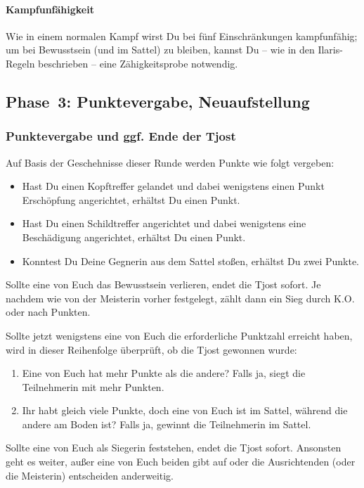 \documentclass[12pt,div=calc,a5paper,parskip=half]{scrartcl}
\begin{document}
\paragraph{Kampfunfähigkeit} Wie in einem normalen Kampf wirst Du bei fünf Einschränkungen kampfunfähig; um bei Bewusstsein (und im Sattel) zu bleiben, kannst Du -- wie in den Ilaris-Regeln beschrieben -- eine Zähigkeitsprobe notwendig. 

\subsection{Phase~3: Punktevergabe, Neuaufstellung}

\subsubsection{Punktevergabe und ggf. Ende der Tjost}
Auf Basis der Geschehnisse dieser Runde werden Punkte wie folgt vergeben:
\begin{itemize}
    \item Hast Du einen Kopftreffer gelandet und dabei wenigstens einen Punkt Erschöpfung angerichtet, erhältst Du einen Punkt. 
    \item Hast Du einen Schildtreffer angerichtet und dabei wenigstens eine Beschädigung angerichtet, erhältst Du einen Punkt.
    \item Konntest Du Deine Gegnerin aus dem Sattel stoßen, erhältst Du zwei Punkte.  
\end{itemize}
Sollte eine von Euch das Bewusstsein verlieren, endet die Tjost sofort. Je nachdem wie von der Meisterin vorher festgelegt, zählt dann ein Sieg durch K.O. oder nach Punkten. 

Sollte jetzt wenigstens eine von Euch die erforderliche Punktzahl erreicht haben, wird in dieser Reihenfolge überprüft, ob die Tjost gewonnen wurde: 
\begin{enumerate}
    \item Eine von Euch hat mehr Punkte als die andere? Falls ja, siegt die Teilnehmerin mit mehr Punkten. 
    \item Ihr habt gleich viele Punkte, doch eine von Euch ist im Sattel, während die andere am Boden ist? Falls ja, gewinnt die Teilnehmerin im Sattel.
\end{enumerate}
Sollte eine von Euch als Siegerin feststehen, endet die Tjost sofort. Ansonsten geht es weiter, außer eine von Euch beiden gibt auf oder die Ausrichtenden (oder die Meisterin) entscheiden anderweitig.
\end{document}
